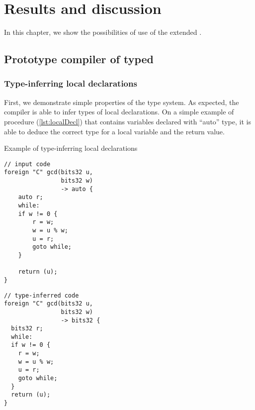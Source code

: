 \chapter{Results and discussion}
\label{chap4}

In this chapter, we show the possibilities of use of the extended \cmm.

\section{Prototype compiler of typed \cmm}

\subsection{Type-inferring local declarations}

First, we demonstrate simple properties of the type system. As expected, the compiler is able to infer types of local declarations. On a simple example of  procedure (\cref{lst:localDecl}) that contains variables declared with ``auto'' type, it is able to deduce the correct type for a local variable and the return value.

\begin{listing}
    \caption{Example of type-inferring local declarations}
    \label{lst:localDecl}
    \begin{center}
    \begin{minipage}{0.5\linewidth}
    \begin{lstlisting}
// input code
foreign "C" gcd(bits32 u,
                bits32 w)
                -> auto {
    auto r;
    while:
    if w != 0 {
        r = w;
        w = u % w;
        u = r;
        goto while;
    }

    return (u);
}
    \end{lstlisting}
    \end{minipage}%
    \begin{minipage}{0.5\linewidth}
    \begin{lstlisting}
// type-inferred code
foreign "C" gcd(bits32 u,
                bits32 w)
                -> bits32 {
  bits32 r;
  while:
  if w != 0 {
    r = w;
    w = u % w;
    u = r;
    goto while;
  }
  return (u);
}
    \end{lstlisting}
    \end{minipage}
    \end{center}
\end{listing}
